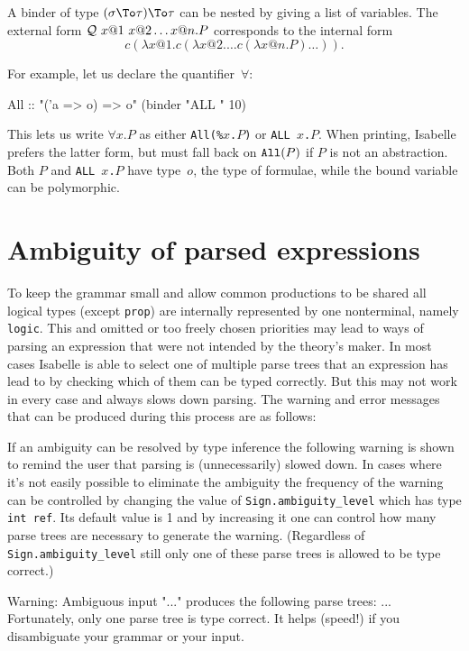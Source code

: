 A binder of type $(\sigma \To \tau) \To \tau$ can be nested by giving a
list of variables.  The external form ${\cal Q}~x@1~x@2 \ldots x@n. P$
corresponds to the internal form
\[ c(\lambda x@1. c(\lambda x@2. \ldots c(\lambda x@n. P) \ldots)). \]

\medskip
For example, let us declare the quantifier~$\forall$:
\begin{ttbox}
All :: "('a => o) => o"   (binder "ALL " 10)
\end{ttbox}
This lets us write $\forall x.P$ as either {\tt All(\%$x$.$P$)} or {\tt ALL
  $x$.$P$}.  When printing, Isabelle prefers the latter form, but must fall
back on ${\tt All}(P)$ if $P$ is not an abstraction.  Both $P$ and {\tt ALL
  $x$.$P$} have type~$o$, the type of formulae, while the bound variable
can be polymorphic.
\endgroup


\section{Ambiguity of parsed expressions} \label{sec:ambiguity}

To keep the grammar small and allow common productions to be shared
all logical types (except {\tt prop}) are internally represented
by one nonterminal, namely {\tt logic}. This and omitted or too freely
chosen priorities may lead to ways of parsing an expression that were
not intended by the theory's maker. In most cases Isabelle is able to
select one of multiple parse trees that an expression has lead
to by checking which of them can be typed correctly. But this may not
work in every case and always slows down parsing.
The warning and error messages that can be produced during this process are
as follows:

If an ambiguity can be resolved by type inference the following
warning is shown to remind the user that parsing is (unnecessarily)
slowed down. In cases where it's not easily possible to eliminate the
ambiguity the frequency of the warning can be controlled by changing
the value of {\tt Sign.ambiguity_level} which has type {\tt int
ref}. Its default value is 1 and by increasing it one can control how
many parse trees are necessary to generate the warning. (Regardless of
{\tt Sign.ambiguity_level} still only one of these parse trees is
allowed to be type correct.)

\begin{ttbox}
{\out Warning: Ambiguous input "..."}
{\out produces the following parse trees:}
{\out ...}
{\out Fortunately, only one parse tree is type correct.}
{\out It helps (speed!) if you disambiguate your grammar or your input.}
\end{ttbox}

